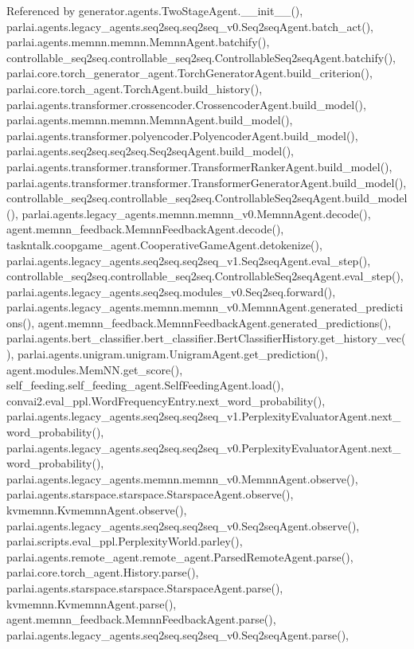 Referenced by generator.\+agents.\+Two\+Stage\+Agent.\+\_\+\+\_\+init\+\_\+\+\_\+(), parlai.\+agents.\+legacy\+\_\+agents.\+seq2seq.\+seq2seq\+\_\+v0.\+Seq2seq\+Agent.\+batch\+\_\+act(), parlai.\+agents.\+memnn.\+memnn.\+Memnn\+Agent.\+batchify(), controllable\+\_\+seq2seq.\+controllable\+\_\+seq2seq.\+Controllable\+Seq2seq\+Agent.\+batchify(), parlai.\+core.\+torch\+\_\+generator\+\_\+agent.\+Torch\+Generator\+Agent.\+build\+\_\+criterion(), parlai.\+core.\+torch\+\_\+agent.\+Torch\+Agent.\+build\+\_\+history(), parlai.\+agents.\+transformer.\+crossencoder.\+Crossencoder\+Agent.\+build\+\_\+model(), parlai.\+agents.\+memnn.\+memnn.\+Memnn\+Agent.\+build\+\_\+model(), parlai.\+agents.\+transformer.\+polyencoder.\+Polyencoder\+Agent.\+build\+\_\+model(), parlai.\+agents.\+seq2seq.\+seq2seq.\+Seq2seq\+Agent.\+build\+\_\+model(), parlai.\+agents.\+transformer.\+transformer.\+Transformer\+Ranker\+Agent.\+build\+\_\+model(), parlai.\+agents.\+transformer.\+transformer.\+Transformer\+Generator\+Agent.\+build\+\_\+model(), controllable\+\_\+seq2seq.\+controllable\+\_\+seq2seq.\+Controllable\+Seq2seq\+Agent.\+build\+\_\+model(), parlai.\+agents.\+legacy\+\_\+agents.\+memnn.\+memnn\+\_\+v0.\+Memnn\+Agent.\+decode(), agent.\+memnn\+\_\+feedback.\+Memnn\+Feedback\+Agent.\+decode(), taskntalk.\+coopgame\+\_\+agent.\+Cooperative\+Game\+Agent.\+detokenize(), parlai.\+agents.\+legacy\+\_\+agents.\+seq2seq.\+seq2seq\+\_\+v1.\+Seq2seq\+Agent.\+eval\+\_\+step(), controllable\+\_\+seq2seq.\+controllable\+\_\+seq2seq.\+Controllable\+Seq2seq\+Agent.\+eval\+\_\+step(), parlai.\+agents.\+legacy\+\_\+agents.\+seq2seq.\+modules\+\_\+v0.\+Seq2seq.\+forward(), parlai.\+agents.\+legacy\+\_\+agents.\+memnn.\+memnn\+\_\+v0.\+Memnn\+Agent.\+generated\+\_\+predictions(), agent.\+memnn\+\_\+feedback.\+Memnn\+Feedback\+Agent.\+generated\+\_\+predictions(), parlai.\+agents.\+bert\+\_\+classifier.\+bert\+\_\+classifier.\+Bert\+Classifier\+History.\+get\+\_\+history\+\_\+vec(), parlai.\+agents.\+unigram.\+unigram.\+Unigram\+Agent.\+get\+\_\+prediction(), agent.\+modules.\+Mem\+N\+N.\+get\+\_\+score(), self\+\_\+feeding.\+self\+\_\+feeding\+\_\+agent.\+Self\+Feeding\+Agent.\+load(), convai2.\+eval\+\_\+ppl.\+Word\+Frequency\+Entry.\+next\+\_\+word\+\_\+probability(), parlai.\+agents.\+legacy\+\_\+agents.\+seq2seq.\+seq2seq\+\_\+v1.\+Perplexity\+Evaluator\+Agent.\+next\+\_\+word\+\_\+probability(), parlai.\+agents.\+legacy\+\_\+agents.\+seq2seq.\+seq2seq\+\_\+v0.\+Perplexity\+Evaluator\+Agent.\+next\+\_\+word\+\_\+probability(), parlai.\+agents.\+legacy\+\_\+agents.\+memnn.\+memnn\+\_\+v0.\+Memnn\+Agent.\+observe(), parlai.\+agents.\+starspace.\+starspace.\+Starspace\+Agent.\+observe(), kvmemnn.\+Kvmemnn\+Agent.\+observe(), parlai.\+agents.\+legacy\+\_\+agents.\+seq2seq.\+seq2seq\+\_\+v0.\+Seq2seq\+Agent.\+observe(), parlai.\+scripts.\+eval\+\_\+ppl.\+Perplexity\+World.\+parley(), parlai.\+agents.\+remote\+\_\+agent.\+remote\+\_\+agent.\+Parsed\+Remote\+Agent.\+parse(), parlai.\+core.\+torch\+\_\+agent.\+History.\+parse(), parlai.\+agents.\+starspace.\+starspace.\+Starspace\+Agent.\+parse(), kvmemnn.\+Kvmemnn\+Agent.\+parse(), agent.\+memnn\+\_\+feedback.\+Memnn\+Feedback\+Agent.\+parse(), parlai.\+agents.\+legacy\+\_\+agents.\+seq2seq.\+seq2seq\+\_\+v0.\+Seq2seq\+Agent.\+parse(), 